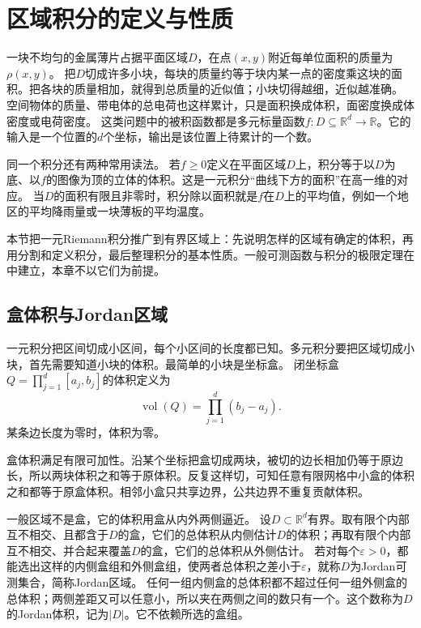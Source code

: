 \section{区域积分的定义与性质}
\label{sec:multivariable-region-integration}

一块不均匀的金属薄片占据平面区域$D$，在点$(x,y)$附近每单位面积的质量为$\rho(x,y)$。
把$D$切成许多小块，每块的质量约等于块内某一点的密度乘这块的面积。把各块的质量相加，就得到总质量的近似值；小块切得越细，近似越准确。
空间物体的质量、带电体的总电荷也这样累计，只是面积换成体积，面密度换成体密度或电荷密度。
这类问题中的被积函数都是多元标量函数$f:D\subseteq\mathbb R^d\to\mathbb R$。它的输入是一个位置的$d$个坐标，输出是该位置上待累计的一个数。

同一个积分还有两种常用读法。
若$f\geq0$定义在平面区域$D$上，积分等于以$D$为底、以$f$的图像为顶的立体的体积。这是一元积分“曲线下方的面积”在高一维的对应。
当$D$的面积有限且非零时，积分除以面积就是$f$在$D$上的平均值，例如一个地区的平均降雨量或一块薄板的平均温度。

本节把一元Riemann积分推广到有界区域上：先说明怎样的区域有确定的体积，再用分割和定义积分，最后整理积分的基本性质。一般可测函数与积分的极限定理在中建立，本章不以它们为前提。

\subsection{盒体积与Jordan区域}

一元积分把区间切成小区间，每个小区间的长度都已知。多元积分要把区域切成小块，首先需要知道小块的体积。最简单的小块是坐标盒。
闭坐标盒$Q=\prod_{j=1}^d[a_j,b_j]$的体积定义为
\[
 \operatorname{vol}(Q)=\prod_{j=1}^d(b_j-a_j).
\]
某条边长度为零时，体积为零。

盒体积满足有限可加性。沿某个坐标把盒切成两块，被切的边长相加仍等于原边长，所以两块体积之和等于原体积。反复这样切，可知任意有限网格中小盒的体积之和都等于原盒体积。相邻小盒只共享边界，公共边界不重复贡献体积。

一般区域不是盒，它的体积用盒从内外两侧逼近。
设$D\subset\mathbb R^d$有界。取有限个内部互不相交、且都含于$D$的盒，它们的总体积从内侧估计$D$的体积；再取有限个内部互不相交、并合起来覆盖$D$的盒，它们的总体积从外侧估计。
若对每个$\varepsilon>0$，都能选出这样的内侧盒组和外侧盒组，使两者总体积之差小于$\varepsilon$，就称$D$为Jordan可测集合，简称Jordan区域。
任何一组内侧盒的总体积都不超过任何一组外侧盒的总体积；两侧差距又可以任意小，所以夹在两侧之间的数只有一个。这个数称为$D$的Jordan体积，记为$|D|$。它不依赖所选的盒组。

